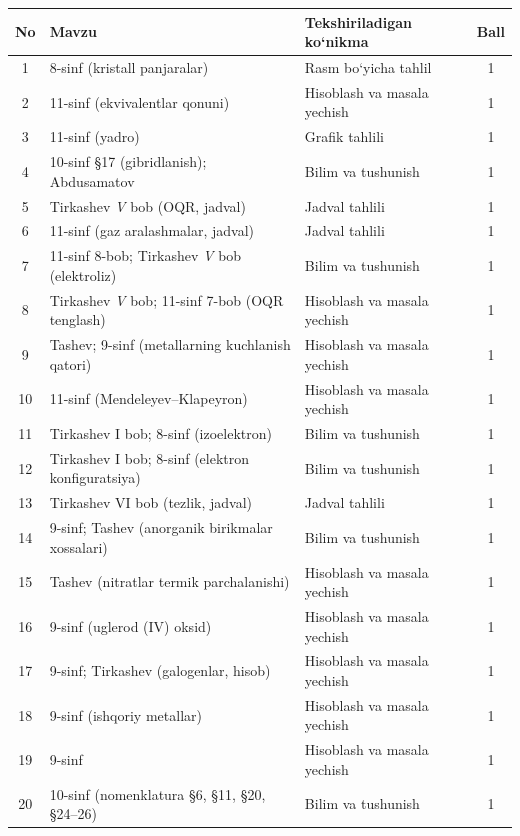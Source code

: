 \documentclass[11pt,a4paper]{article}
\begin{document}
{\small\noindent\begin{longtable}{|c|p{7.2cm}|p{5.4cm}|c|}\hline \textbf{No} & \textbf{Mavzu} & \textbf{Tekshiriladigan ko`nikma} & \textbf{Ball}\\\hline
1 & 8-sinf (kristall panjaralar) & Rasm bo`yicha tahlil & 1\\\hline
2 & 11-sinf (ekvivalentlar qonuni) & Hisoblash va masala yechish & 1\\\hline
3 & 11-sinf (yadro) & Grafik tahlili & 1\\\hline
4 & 10-sinf \S{}17 (gibridlanish); Abdusamatov & Bilim va tushunish & 1\\\hline
5 & Tirkashev \textit{V} bob (OQR, jadval) & Jadval tahlili & 1\\\hline
6 & 11-sinf (gaz aralashmalar, jadval) & Jadval tahlili & 1\\\hline
7 & 11-sinf 8-bob; Tirkashev \textit{V} bob (elektroliz) & Bilim va tushunish & 1\\\hline
8 & Tirkashev \textit{V} bob; 11-sinf 7-bob (OQR tenglash) & Hisoblash va masala yechish & 1\\\hline
9 & Tashev; 9-sinf (metallarning kuchlanish qatori) & Hisoblash va masala yechish & 1\\\hline
10 & 11-sinf (Mendeleyev--Klapeyron) & Hisoblash va masala yechish & 1\\\hline
11 & Tirkashev I bob; 8-sinf (izoelektron) & Bilim va tushunish & 1\\\hline
12 & Tirkashev I bob; 8-sinf (elektron konfiguratsiya) & Bilim va tushunish & 1\\\hline
13 & Tirkashev VI bob (tezlik, jadval) & Jadval tahlili & 1\\\hline
14 & 9-sinf; Tashev (anorganik birikmalar xossalari) & Bilim va tushunish & 1\\\hline
15 & Tashev (nitratlar termik parchalanishi) & Hisoblash va masala yechish & 1\\\hline
16 & 9-sinf (uglerod (IV) oksid) & Hisoblash va masala yechish & 1\\\hline
17 & 9-sinf; Tirkashev (galogenlar, hisob) & Hisoblash va masala yechish & 1\\\hline
18 & 9-sinf (ishqoriy metallar) & Hisoblash va masala yechish & 1\\\hline
19 & 9-sinf & Hisoblash va masala yechish & 1\\\hline
20 & 10-sinf (nomenklatura \S{}6, \S{}11, \S{}20, \S{}24--26) & Bilim va tushunish & 1\\\hline

\end{longtable}}
\end{document}
